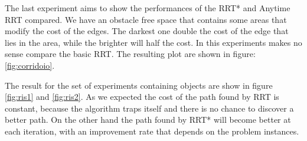 \documentclass[10pt]{article}
\begin{document}
	The last experiment aims to show the performances of the RRT* and Anytime RRT compared. We have an obstacle free space that contains some areas that modify the cost of the edges. The darkest one double the cost of the edge that lies in the area, while the brighter will half the cost. In this experiments makes no sense compare the basic RRT. The resulting plot are shown in figure: \ref{fig:corridoio}. 
	
	The result for the set of experiments containing objects are show in figure \ref{fig:ris1} and \ref{fig:ris2}. As we expected the cost of the path found by RRT is constant, because the algorithm traps itself and there is no chance to discover a better path. On the other hand the path found by RRT* will become better at each iteration, with an improvement rate that depends on the problem instances.
\begin{figure}[!hbt]
	

\end{figure}
\end{document}
